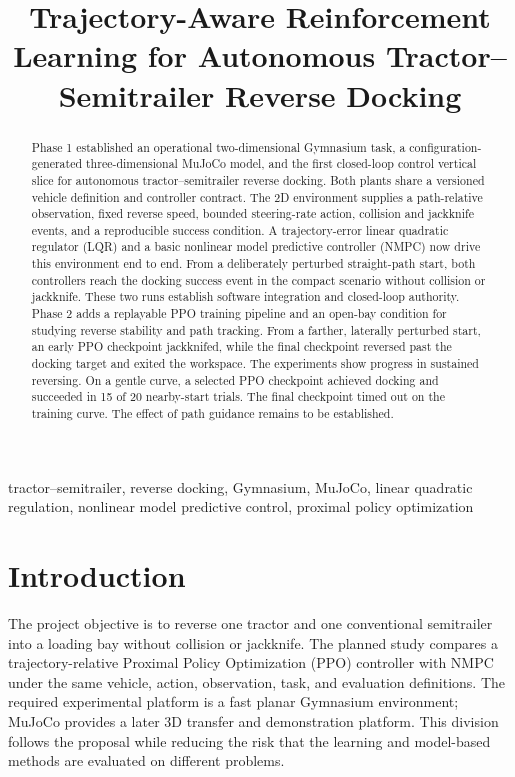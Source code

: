 \documentclass[conference]{IEEEtran}
\title{Trajectory-Aware Reinforcement Learning for
Autonomous Tractor–Semitrailer Reverse Docking}
\author{
  \IEEEauthorblockN{Nandan Prince, Chris Pedretti}
  \IEEEauthorblockA{MSML 642, Group 20}
  \IEEEauthorblockA{Phase 2 Report : Nov 26, 2026}
}
\begin{document}
\maketitle

\begin{abstract}
Phase 1 established an operational two-dimensional Gymnasium task,
a configuration-generated three-dimensional MuJoCo model, and the first
closed-loop control vertical slice for autonomous tractor--semitrailer reverse
docking. Both plants share a versioned vehicle definition and controller
contract. The 2D environment supplies a path-relative observation, fixed
reverse speed, bounded steering-rate action, collision and jackknife events,
and a reproducible success condition. A trajectory-error linear quadratic
regulator (LQR) and a basic nonlinear model predictive controller (NMPC) now
drive this environment end to end. From a deliberately perturbed straight-path
start, both controllers reach the docking success event in the compact
scenario without collision or jackknife. These two runs establish software
integration and closed-loop authority. Phase 2 adds a replayable PPO
training pipeline and an open-bay condition for studying reverse stability
and path tracking. From a farther, laterally perturbed start, an early PPO
checkpoint jackknifed, while the final checkpoint reversed past the docking
target and exited the workspace. The experiments show progress in sustained
reversing. On a gentle curve, a selected PPO checkpoint achieved docking
and succeeded in 15 of 20 nearby-start trials. The final checkpoint
timed out on the training curve. The effect of path guidance remains to be
established.
\end{abstract}

\begin{IEEEkeywords}
tractor--semitrailer, reverse docking, Gymnasium, MuJoCo, linear quadratic
regulation, nonlinear model predictive control, proximal policy optimization
\end{IEEEkeywords}

\section{Introduction}

The project objective is to reverse one tractor and one conventional
semitrailer into a loading bay without collision or jackknife. The planned
study compares a trajectory-relative Proximal Policy Optimization (PPO)
controller with NMPC under the same vehicle, action, observation, task, and
evaluation definitions. The required experimental platform is a fast planar
Gymnasium environment; MuJoCo provides a later 3D transfer and demonstration
platform. This division follows the proposal while reducing the risk that the
learning and model-based methods are evaluated on different problems.
\end{document}
